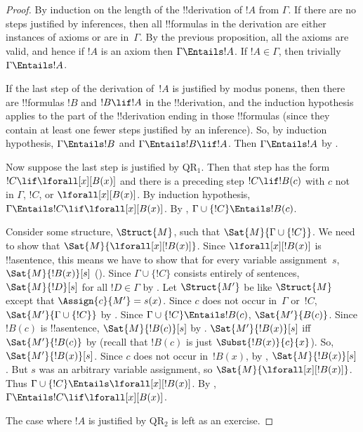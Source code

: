 \documentclass[../../include/open-logic-section]{subfiles}
\begin{document}
\begin{proof}
By induction on the length of the !!{derivation} of $!A$ from
$\Gamma$. If there are no steps justified by inferences, then all
!!{formula}s in the derivation are either instances of axioms or are
in~$\Gamma$. By the previous proposition, all the axioms are valid,
and hence if $!A$ is an axiom then $\Gamma \Entails !A$. If $!A \in
\Gamma$, then trivially $\Gamma \Entails !A$.

If the last step of the derivation of~$!A$ is justified by modus ponens,
then there are !!{formula}s $!B$ and $!B \lif !A$ in the
!!{derivation}, and the induction hypothesis applies to the part of
the !!{derivation} ending in those !!{formula}s (since they contain at
least one fewer steps justified by an inference).  So, by induction
hypothesis, $\Gamma \Entails !B$ and $\Gamma \Entails !B \lif !A$. Then
$\Gamma \Entails !A$ by .

Now suppose the last step is justified by
QR$_1$. Then that step has the form $!C \lif \lforall[x][B(x)]$ and
there is a preceding step $!C \lif !B(c)$ with $c$ not in $\Gamma$,
$!C$, or $\lforall[x][B(x)]$. By induction hypothesis, $\Gamma
\Entails !C \lif \lforall[x][B(x)]$. By
, $\Gamma \cup \{!C\} \Entails
!B(c)$.

Consider some structure, $\Struct{M}$, such that $\Sat{M}{\Gamma \cup
  \{!C\}}$.  We need to show that $\Sat{M}{\lforall[x][!B(x)]}$. Since
$\lforall[x][!B(x)]$ is !!a{sentence}, this means we have to show that
for every variable assignment~$s$, $\Sat{M}{!B(x)}[s]$
(). Since $\Gamma \cup \{!C\}$
consists entirely of sentences, $\Sat{M}{!D}[s]$ for all $!D \in
\Gamma$ by .  Let $\Struct{M'}$ be
like $\Struct{M}$ except that $\Assign{c}{M'} = s(x)$.  Since $c$ does
not occur in~$\Gamma$ or~$!C$, $\Sat{M'}{\Gamma \cup \{!C\}}$ by
. Since $\Gamma \cup \{!C\}
\Entails !B(c)$, $\Sat{M'}{B(c)}$.  Since $!B(c)$ is !!a{sentence},
$\Sat{M}{!B(c)}[s]$ by
. $\Sat{M'}{!B(x)}[s]$ iff
$\Sat{M'}{!B(c)}$ by  (recall that
$!B(c)$ is just $\Subst{!B(x)}{c}{x}$). So,
$\Sat{M'}{!B(x)}[s]$. Since $c$ does not occur in~$!B(x)$, by
, $\Sat{M}{!B(x)}[s]$. But $s$
was an arbitrary variable assignment, so
$\Sat{M}{\lforall[x][!B(x)]}$. Thus $\Gamma \cup \{!C\} \Entails
\lforall[x][!B(x)]$. By , $\Gamma
\Entails !C \lif \lforall[x][B(x)]$.

The case where $!A$ is justified by QR$_2$ is left as an exercise.
\end{proof}
\end{document}
